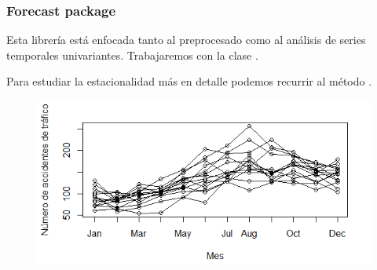 \documentclass[10pt,a4paper,twoside]{beamer}
\begin{document}
\begin{frame}
\frametitle{Forecast package}
Esta librería está enfocada tanto al preprocesado como al análisis de series temporales univariantes. Trabajaremos con la clase .\\
\vspace{0.3cm}

\begin{itemize*}
\item Para estudiar la estacionalidad más en detalle podemos recurrir al método .
\end{itemize*}

\begin{figure}
    \centering
    \centerline{\includegraphics[scale = 0.6]{Images/32.png}}
    \label{season}
\end{figure}

\end{frame}

\end{document}
